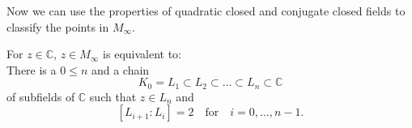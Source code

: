 



Now we can use the properties of quadratic closed and conjugate closed fields to classify the points in $M_{\infty}$.

\begin{theorem}
    \label{thm:Classfication_z_in_M_inf}
    \leanok
    For $z \in \mathbb{C}$, $z \in M_{\infty}$ is equivalent to:\\
    There is a $0\le n$ and a chain 
    $$K_0 = L_1 \subset L_2 \subset \ldots \subset L_n \subset \mathbb{C}$$
    of subfields of $\mathbb{C}$ such that $z \in L_n$ and 
    $$ [L_{i+1}:L_i] = 2 \quad \text{for} \quad i = 0, \ldots, n-1.$$
\end{theorem}

